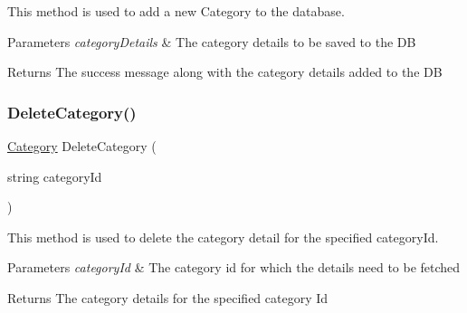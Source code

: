 This method is used to add a new Category to the database. 


\begin{DoxyParams}{Parameters}
{\em category\+Details} & The category details to be saved to the DB\\
\hline
\end{DoxyParams}
\begin{DoxyReturn}{Returns}
The success message along with the category details added to the DB
\end{DoxyReturn}
\mbox{\label{classWildLifeTracker_1_1Repository_1_1CategoryRepo_a3dcd00ae5abcdcd32e325a71afb7cb48}} 
\subsubsection{\texorpdfstring{Delete\+Category()}{DeleteCategory()}}
{\footnotesize\ttfamily \hyperlink{classWildLifeTracker_1_1Models_1_1Category}{Category} Delete\+Category (\begin{DoxyParamCaption}\item[{string}]{category\+Id }\end{DoxyParamCaption})\hspace{0.3cm}{\ttfamily [inline]}}



This method is used to delete the category detail for the specified category\+Id. 


\begin{DoxyParams}{Parameters}
{\em category\+Id} & The category id for which the details need to be fetched\\
\hline
\end{DoxyParams}
\begin{DoxyReturn}{Returns}
The category details for the specified category Id
\end{DoxyReturn}
\mbox{\label{classWildLifeTracker_1_1Repository_1_1CategoryRepo_a830fdfa06499b071009c5b454e08c114}} 
